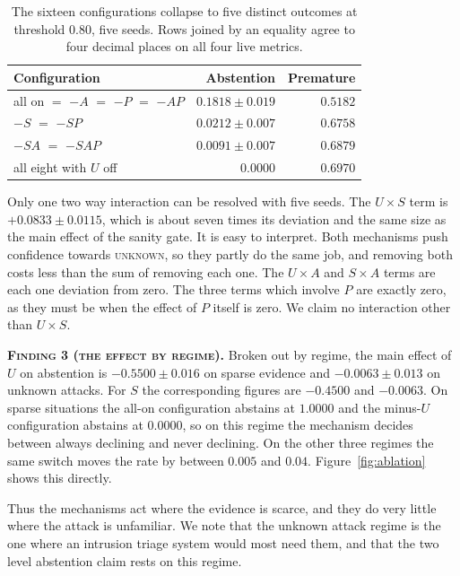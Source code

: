 \documentclass[conference]{IEEEtran}
\newcommand{\finding}[1]{\textsc{#1}}
\begin{document}
\begin{table}[t]
\caption{The sixteen configurations collapse to five distinct outcomes at
threshold $0.80$, five seeds. Rows joined by an equality agree to four
decimal places on all four live metrics.}
\label{tab:collapse}
\centering
\small
\begin{tabular}{@{}lrr@{}}
\toprule
Configuration & Abstention & Premature \\
\midrule
all on $=$ $-A$ $=$ $-P$ $=$ $-AP$ & $0.1818 \pm 0.019$ & $0.5182$ \\
$-S$ $=$ $-SP$ & $0.0212 \pm 0.007$ & $0.6758$ \\
$-SA$ $=$ $-SAP$ & $0.0091 \pm 0.007$ & $0.6879$ \\
all eight with $U$ off & $0.0000$ & $0.6970$ \\
\bottomrule
\end{tabular}
\end{table}

Only one two way interaction can be resolved with five seeds. The $U \times S$
term is $+0.0833 \pm 0.0115$, which is about seven times its deviation and the
same size as the main effect of the sanity gate. It is easy to interpret. Both
mechanisms push confidence towards \textsc{unknown}, so they partly do the same
job, and removing both costs less than the sum of removing each one. The
$U \times A$ and $S \times A$ terms are each one deviation from zero. The three
terms which involve $P$ are exactly zero, as they must be when the effect of
$P$ itself is zero. We claim no interaction other than $U \times S$.

\textbf{\finding{Finding 3 (the effect by regime).}}
Broken out by regime, the main effect of $U$ on abstention is $-0.5500 \pm
0.016$ on sparse evidence and $-0.0063 \pm 0.013$ on unknown attacks. For $S$
the corresponding figures are $-0.4500$ and $-0.0063$. On sparse situations
the all-on configuration abstains at $1.0000$ and the minus-$U$ configuration
abstains at $0.0000$, so on this regime the mechanism decides between always
declining and never declining. On the other three regimes the same switch
moves the rate by between $0.005$ and $0.04$. Figure~\ref{fig:ablation} shows
this directly.

Thus the mechanisms act where the evidence is scarce, and they do very little
where the attack is unfamiliar. We note that the unknown attack regime is the
one where an intrusion triage system would most need them, and that the two
level abstention claim rests on this regime.
\end{document}
